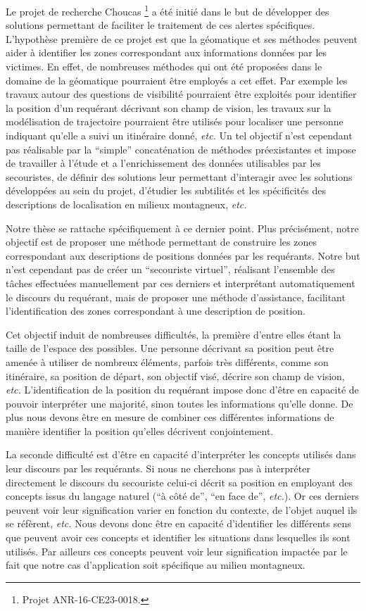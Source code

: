 Le projet de recherche Choucas \footnote{Projet ANR-16-CE23-0018.} a
été initié dans le but de développer des solutions permettant de
faciliter le traitement de ces alertes spécifiques. L'hypothèse
première de ce projet est que la géomatique et ses méthodes peuvent
aider à identifier les zones correspondant aux informations données
par les victimes. En effet, de nombreuses méthodes qui ont été
proposées dans le domaine de la géomatique pourraient être employés a
cet effet. Par exemple les travaux autour des questions de visibilité
pourraient être exploités pour identifier la position d'un requérant
décrivant son champ de vision, les travaux sur la modélisation de
trajectoire pourraient être utilisés pour localiser une personne
indiquant qu'elle a suivi un itinéraire donné, \emph{etc.} Un tel
objectif n'est cependant pas réalisable par la \enquote{simple}
concaténation de méthodes préexistantes et impose de travailler à
l'étude et a l’enrichissement des données utilisables par les
secouristes, de définir des solutions leur permettant d’interagir avec
les solutions développées au sein du projet, d'étudier les subtilités
et les spécificités des descriptions de localisation en milieux
montagneux, \emph{etc.}

Notre thèse se rattache spécifiquement à ce dernier point. Plus
précisément, notre objectif est de proposer une méthode permettant de
construire les zones correspondant aux descriptions de positions
données par les requérants. Notre but n'est cependant pas de créer un
\enquote{secouriste virtuel}, réalisant l'ensemble des tâches
effectuées manuellement par ces derniers et interprétant
automatiquement le discours du requérant, mais de proposer une méthode
d'assistance, facilitant l'identification des zones correspondant à
une description de position.

Cet objectif induit de nombreuses difficultés, la première d'entre
elles étant la taille de l'espace des possibles. Une personne
décrivant sa position peut être amenée à utiliser de nombreux
éléments, parfois très différents, comme son itinéraire, sa position
de départ, son objectif visé, décrire son champ de vision, \emph{etc.}
L'identification de la position du requérant impose donc d'être en
capacité de pouvoir interpréter une majorité, sinon toutes les
informations qu'elle donne. De plus nous devons être en mesure de
combiner ces différentes informations de manière identifier la
position qu'elles décrivent conjointement.

La seconde difficulté est d'être en capacité d'interpréter les
concepts utilisés dans leur discours par les requérants. Si nous ne
cherchons pas à interpréter directement le discours du secouriste
celui-ci décrit sa position en employant des concepts issus du langage
naturel (\eg \enquote{à côté de}, \enquote{en face de},
\emph{etc.}). Or ces derniers peuvent voir leur signification varier
en fonction du contexte, de l'objet auquel ils se réfèrent,
\emph{etc.}  Nous devons donc être en capacité d'identifier les
différents sens que peuvent avoir ces concepts et identifier les
situations dans lesquelles ils sont utilisés. Par ailleurs ces
concepts peuvent voir leur signification impactée par le fait que
notre cas d’application soit spécifique au milieu montagneux.

